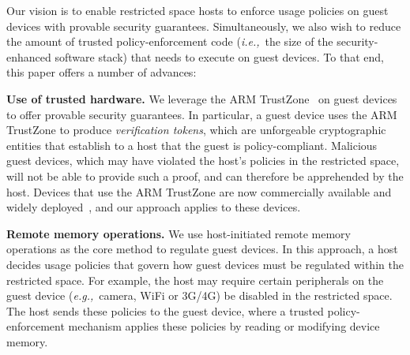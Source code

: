 \documentclass[pageno]{sig-alternate-05-2015}
\newcommand{\emphitem}[1]{\textbf{#1}}
\newcommand*\circled[1]{\tikz[baseline=(char.base)]{
            \node[shape=circle,draw,inner sep=0.5pt] (char) {#1};}}
\newcounter{myctr}
\newenvironment{mylist}{\begin{list}{\textbf{\circled{\arabic{myctr}}}}
{\usecounter{myctr}
\setlength{\topsep}{1mm}\setlength{\itemsep}{0.5mm}
\setlength{\parsep}{0.5mm}
\setlength{\listparindent}{\parindent} %
\setlength{\itemindent}{0mm}\setlength{\partopsep}{0mm}
\setlength{\labelwidth}{-2mm}
\setlength{\leftmargin}{0mm}}}{\end{list}}
\newcommand{\eg}{\textit{e.g.,}}
\newcommand{\ie}{\textit{i.e.,}}
\begin{document}
Our vision is to enable restricted space hosts to enforce usage policies on
guest devices with provable security guarantees. Simultaneously, we also wish
to reduce the amount of trusted policy-enforcement code (\ie~the size of the
security-enhanced software stack) that needs to execute on guest devices. To
that end, this paper offers a number of advances:

\begin{mylist}
%
\item \emphitem{Use of trusted hardware.} We leverage the ARM
TrustZone~\cite{armtz} on guest devices to offer provable security guarantees.
In particular, a guest device uses the ARM TrustZone to produce
\textit{verification tokens}, which are unforgeable cryptographic entities that
establish to a host that the guest is policy-compliant.  Malicious guest
devices, which may have violated the host's policies in the restricted space,
will not be able to provide such a proof, and can therefore be apprehended by
the host. Devices that use the ARM TrustZone are now commercially available and
widely deployed~\cite{knox:ccs14}, and our approach applies to these devices.
%
\item \emphitem{Remote memory operations.} We use host-initiated remote memory
operations as the core method to regulate guest devices. In this approach, a
host decides usage policies that govern how guest devices must be regulated
within the restricted space. For example, the host may require certain
peripherals on the guest device (\eg~camera, WiFi or 3G/4G) be disabled in the
restricted space. The host sends these policies to the guest device, where a
trusted policy-enforcement mechanism applies these policies by reading or
modifying device memory. 


\end{mylist}
\end{document}
